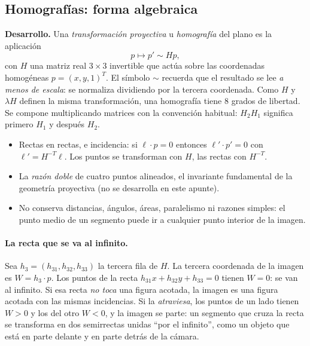 \subsection{Homografías: forma algebraica}\label{sec:homografias}

\textbf{Desarrollo.} Una \emph{transformación proyectiva} u \emph{homografía} del plano es la
aplicación
\[
  \boxed{p\longmapsto p'\sim Hp},
\]
con \(H\) una matriz real \(3\times3\) invertible que actúa sobre las coordenadas
homogéneas \(p=(x,y,1)^T\). El símbolo \(\sim\) recuerda que el resultado se lee \emph{a menos
de escala}: se normaliza dividiendo por la tercera coordenada. Como \(H\) y \(\lambda H\)
definen la misma transformación, una homografía tiene \(8\) grados de libertad. Se compone
multiplicando matrices con la convención habitual: \(H_2H_1\) significa primero \(H_1\) y
después \(H_2\).

\begin{resultado}
\begin{itemize}
  \item Rectas en rectas, e incidencia: si \(\ell\cdot p=0\) entonces \(\ell'\cdot p'=0\)
  con \(\ell'=H^{-T}\ell\). Los puntos se transforman con \(H\), las rectas con
  \(H^{-T}\).
  \item La \emph{razón doble} de cuatro puntos alineados, el invariante fundamental de la
  geometría proyectiva (no se desarrolla en este apunte).
  \item No conserva distancias, ángulos, áreas, paralelismo ni razones simples: el punto medio
  de un segmento puede ir a cualquier punto interior de la imagen.
\end{itemize}
\end{resultado}

\paragraph{La recta que se va al infinito.}
Sea \(h_3=(h_{31},h_{32},h_{33})\) la tercera fila de \(H\). La tercera coordenada de la
imagen es \(W=h_3\cdot p\). Los puntos de la recta \(h_{31}x+h_{32}y+h_{33}=0\) tienen
\(W=0\): se van al infinito. Si esa recta \emph{no toca} una figura acotada, la imagen es una
figura acotada con las mismas incidencias. Si la \emph{atraviesa}, los puntos de un lado
tienen \(W>0\) y los del otro \(W<0\), y la imagen se parte: un segmento que cruza la recta se
transforma en dos semirrectas unidas ``por el infinito'', como un objeto que está en parte
delante y en parte detrás de la cámara.

